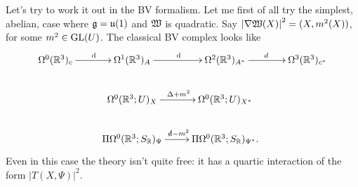 \documentclass[10pt, oneside]{article}
\begin{document}
Let's try to work it out in the BV formalism.  Let me first of all try the simplest, abelian, case where $\mathfrak{g} = \mathfrak{u}(1)$ and $\mathfrak{W}$ is quadratic.  Say $\left| \nabla \mathfrak{W}(X)\right|^2 = (X, m^2(X))$, for some $m^2 \in \mathrm{GL}(U)$.  The classical BV complex looks like
\[\xymatrix{
\Omega^0(\RR^3)_c \ar[r]^\d &\Omega^1(\RR^3)_A \ar[r]^\d &\Omega^2(\RR^3)_{A^*} \ar[r]^d &\Omega^3(\RR^3)_{c^*} \\
&\Omega^0(\RR^3;U)_X \ar[r]^{\Delta + m^2} &\Omega^0(\RR^3; U)_{X^*} & \\
&\Pi \Omega^0(\RR^3; S_\RR)_\Psi \ar[r]^{\sd \d - m^2} &\Pi \Omega^0(\RR^3; S_\RR)_{\Psi^*}.
}\]
Even in this case the theory isn't quite free: it has a quartic interaction of the form $|T(X,\Psi)|^2$. 








 
\end{document}
